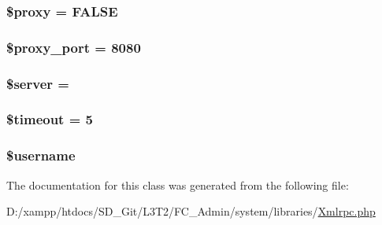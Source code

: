 \subsubsection[{\$proxy}]{\setlength{\rightskip}{0pt plus 5cm}\$proxy = F\+A\+L\+S\+E}\label{class_x_m_l___r_p_c___client_a01564a63e754b8037a987f7f8fde0e6d}
\hypertarget{class_x_m_l___r_p_c___client_a778054bf2337c6516bdad84294329511}{}
\subsubsection[{\$proxy\+\_\+port}]{\setlength{\rightskip}{0pt plus 5cm}\$proxy\+\_\+port = 8080}\label{class_x_m_l___r_p_c___client_a778054bf2337c6516bdad84294329511}
\hypertarget{class_x_m_l___r_p_c___client_ad135cc8a47e55f0829949cf62214170f}{}
\subsubsection[{\$server}]{\setlength{\rightskip}{0pt plus 5cm}\${\bf server} = \textquotesingle{}\textquotesingle{}}\label{class_x_m_l___r_p_c___client_ad135cc8a47e55f0829949cf62214170f}
\hypertarget{class_x_m_l___r_p_c___client_a84320a9bf3e591d7ae20dfcb0dfe6a0d}{}
\subsubsection[{\$timeout}]{\setlength{\rightskip}{0pt plus 5cm}\${\bf timeout} = 5}\label{class_x_m_l___r_p_c___client_a84320a9bf3e591d7ae20dfcb0dfe6a0d}
\hypertarget{class_x_m_l___r_p_c___client_a0eb82aa5f81cf845de4b36cd653c42cf}{}
\subsubsection[{\$username}]{\setlength{\rightskip}{0pt plus 5cm}\$username}\label{class_x_m_l___r_p_c___client_a0eb82aa5f81cf845de4b36cd653c42cf}


The documentation for this class was generated from the following file\+:\begin{DoxyCompactItemize}
\item 
D\+:/xampp/htdocs/\+S\+D\+\_\+\+Git/\+L3\+T2/\+F\+C\+\_\+\+Admin/system/libraries/\hyperlink{_xmlrpc_8php}{Xmlrpc.\+php}\end{DoxyCompactItemize}
